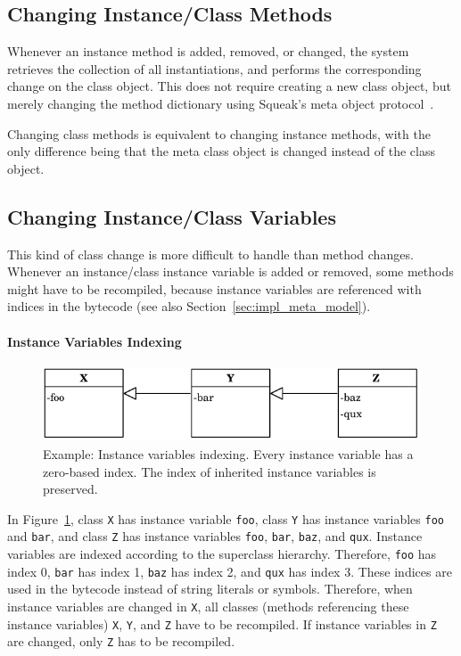 \subsection{Changing Instance/Class Methods}
Whenever an instance method is added, removed, or changed, the system retrieves the collection of all instantiations, and performs the corresponding change on the class object. This does not require creating a new class object, but merely changing the method dictionary using Squeak's meta object protocol~\cite{Goldberg:1983:SLI:273, Kiczales:1991:AMP:574212}.

Changing class methods is equivalent to changing instance methods, with the only difference being that the meta class object is changed instead of the class object.

\subsection{Changing Instance/Class Variables}
\label{sec:impl_ch_inst_cl_vars}
This kind of class change is more difficult to handle than method changes. Whenever an instance/class instance variable is added or removed, some methods might have to be recompiled, because instance variables are referenced with indices in the bytecode (see also Section~\ref{sec:impl_meta_model}). 

\paragraph{Instance Variables Indexing}
\begin{figure}[!htp]
	\centering
	\includegraphics[scale=1]{inst_vars.pdf}
	\caption[Example: Instance variables indexing]{Example: Instance variables indexing. Every instance variable has a zero-based index. The index of inherited instance variables is preserved.}
	\label{fig:impl_inst_vars}
\end{figure}

In Figure~\ref{fig:impl_inst_vars}, class \texttt{X} has instance variable \texttt{foo}, class \texttt{Y} has instance variables \texttt{foo} and \texttt{bar}, and class \texttt{Z} has instance variables \texttt{foo}, \texttt{bar}, \texttt{baz}, and \texttt{qux}. Instance variables are indexed according to the superclass hierarchy. Therefore, \texttt{foo} has index 0, \texttt{bar} has index 1, \texttt{baz} has index 2, and \texttt{qux} has index 3. These indices are used in the bytecode instead of string literals or symbols. Therefore, when instance variables are changed in \texttt{X}, all classes (methods referencing these instance variables) \texttt{X}, \texttt{Y}, and \texttt{Z} have to be recompiled. If instance variables in \texttt{Z} are changed, only \texttt{Z} has to be recompiled.

